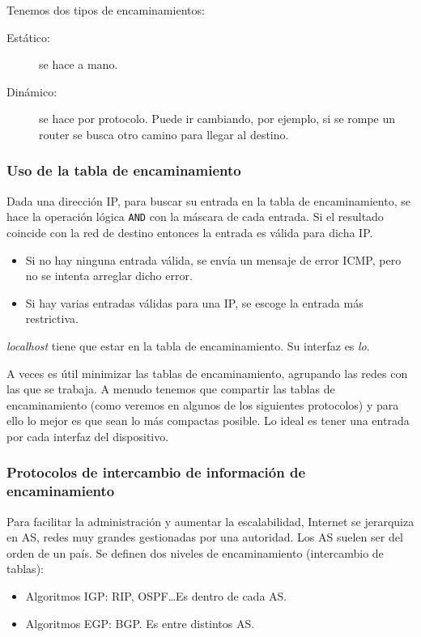 \noindent
Tenemos dos tipos de encaminamientos:
\begin{description}
    \item [Estático:] se hace a mano.
    \item [Dinámico:] se hace por protocolo. Puede ir cambiando, por ejemplo, si se rompe un router se busca otro camino para llegar al destino.
\end{description}

\subsubsection{Uso de la tabla de encaminamiento}
Dada una dirección IP, para buscar su entrada en la tabla de encaminamiento, se hace la operación lógica \verb|AND| con la máscara de cada entrada. Si el resultado coincide con la red de destino entonces la entrada es válida para dicha IP\@.
\begin{itemize}
    \item Si no hay ninguna entrada válida, se envía un mensaje de error \acrshort{ICMP}, pero no se intenta arreglar dicho error.
    \item Si hay varias entradas válidas para una IP\@, se escoge la entrada más restrictiva. 

\end{itemize}

\begin{observacion}
    \textit{localhost} tiene que estar en la tabla de encaminamiento. Su interfaz es \textit{lo}.
\end{observacion}

A veces es útil minimizar las tablas de encaminamiento, agrupando las redes con las que se trabaja. A menudo tenemos que compartir las tablas de encaminamiento (como veremos en algunos de los siguientes protocolos) y para ello lo mejor es que sean lo más compactas posible. Lo ideal es tener una entrada por cada interfaz del dispositivo. 

\subsubsection{Protocolos de intercambio de información de encaminamiento}

Para facilitar la administración y aumentar la escalabilidad, Internet se jerarquiza en \acrfull{AS}, redes muy grandes gestionadas por una autoridad. Los \acrshort{AS} suelen ser del orden de un país. Se definen dos niveles de encaminamiento (intercambio de tablas):
\begin{itemize}
    \item Algoritmos \acrfull{IGP}: \acrshort{RIP}, \acrshort{OSPF}\ldots Es dentro de cada \acrshort{AS}.
    \item Algoritmos \acrfull{EGP}: \acrshort{BGP}. Es entre distintos \acrshort{AS}.
\end{itemize}

